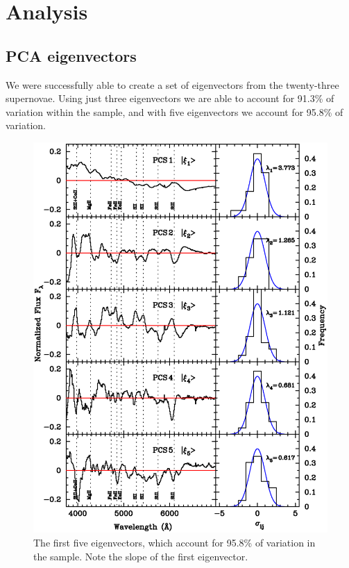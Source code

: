 \section{Analysis}
\subsection{PCA eigenvectors}

We were successfully able to create a set of eigenvectors from the twenty-three supernovae. Using just three eigenvectors we are able to account for 91.3\% of
variation within the sample, and with five eigenvectors we account for 95.8\% of variation. 



\begin{figure}[htp]
\begin{center}
\includegraphics[angle=0,scale=0.8]{./figures/pca/20SNe_PCS_01to05_areanorm.ps}
\end{center}
\caption{
The first five eigenvectors, which account for 95.8\% of variation in the sample. Note the slope of the first eigenvector.
}
\label{fig:eigne1}
\end{figure}
